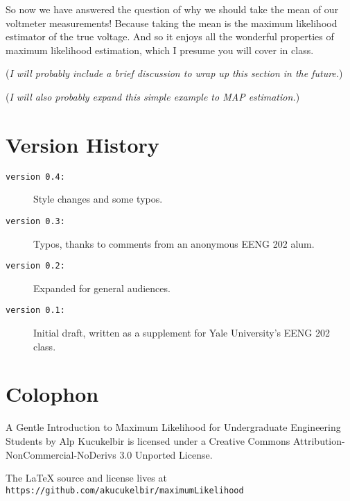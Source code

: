 \documentclass[10pt,letterpaper]{article}
\begin{document}
So now we have answered the question of why we should take the mean of our voltmeter measurements! Because taking the mean is the maximum likelihood estimator of the true voltage. And so it enjoys all the wonderful properties of maximum likelihood estimation, which I presume you will cover in class. 

(\emph{I will probably include a brief discussion to wrap up this section in the future.})

(\emph{I will also probably expand this simple example to MAP estimation.})

\section{Version History}
\begin{description}
	\item[\texttt{version 0.4:}] Style changes and some typos.
	\item[\texttt{version 0.3:}] Typos, thanks to comments from an anonymous EENG 202 alum.
	\item[\texttt{version 0.2:}] Expanded for general audiences.
	\item[\texttt{version 0.1:}] Initial draft, written as a supplement for Yale University's EENG 202 class.
\end{description}

\section{Colophon}
A Gentle Introduction to Maximum Likelihood for Undergraduate Engineering Students by Alp Kucukelbir is licensed under a Creative Commons Attribution-NonCommercial-NoDerivs 3.0 Unported License.

The \LaTeX{} source and license lives at \texttt{https://github.com/akucukelbir/maximumLikelihood}
\end{document}
